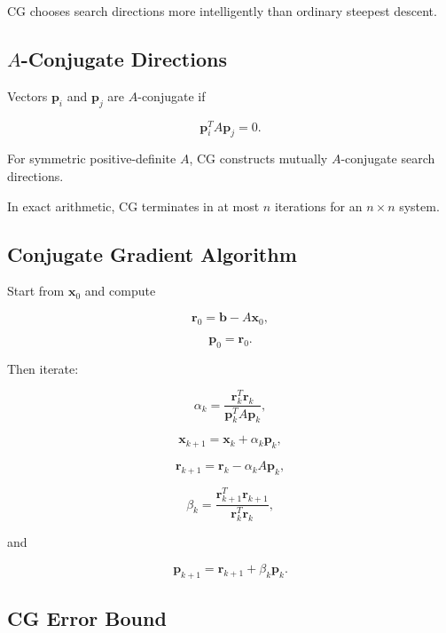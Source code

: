 CG chooses search directions more intelligently than ordinary steepest
descent.

\subsection{\(A\)-Conjugate Directions}
\label{subsec:a-conjugate-directions}

Vectors \(\mathbf{p}_i\) and \(\mathbf{p}_j\) are \(A\)-conjugate if

\[
\boxed{
\mathbf{p}_i^TA\mathbf{p}_j
=
0.
}
\]

For symmetric positive-definite \(A\), CG constructs mutually
\(A\)-conjugate search directions.

In exact arithmetic, CG terminates in at most \(n\) iterations for an
\(n\times n\) system.

\subsection{Conjugate Gradient Algorithm}
\label{subsec:cg-algorithm}

Start from \(\mathbf{x}_0\) and compute

\[
\boxed{
\mathbf{r}_0
=
\mathbf{b}
-
A\mathbf{x}_0,
}
\]

\[
\boxed{
\mathbf{p}_0
=
\mathbf{r}_0.
}
\]

Then iterate:

\[
\boxed{
\alpha_k
=
\frac{
\mathbf{r}_k^T\mathbf{r}_k
}{
\mathbf{p}_k^TA\mathbf{p}_k
},
}
\]

\[
\boxed{
\mathbf{x}_{k+1}
=
\mathbf{x}_k
+
\alpha_k
\mathbf{p}_k,
}
\]

\[
\boxed{
\mathbf{r}_{k+1}
=
\mathbf{r}_k
-
\alpha_k
A\mathbf{p}_k,
}
\]

\[
\boxed{
\beta_k
=
\frac{
\mathbf{r}_{k+1}^T\mathbf{r}_{k+1}
}{
\mathbf{r}_k^T\mathbf{r}_k
},
}
\]

and

\[
\boxed{
\mathbf{p}_{k+1}
=
\mathbf{r}_{k+1}
+
\beta_k
\mathbf{p}_k.
}
\]

\subsection{CG Error Bound}
\label{subsec:cg-error-bound}


